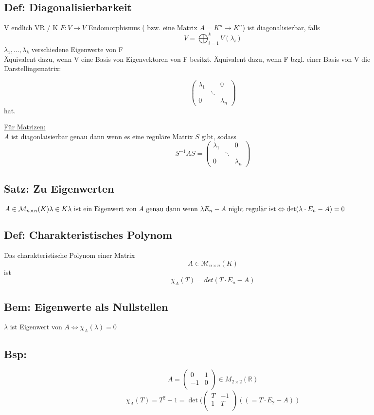 \documentclass[titlepage,12pt,a4paper,ngerman]{report}
\begin{document}
\subsection{Def: Diagonalisierbarkeit} V endlich VR / K
$ F: V \to V$ Endomorphismus ( bzw. eine Matrix $A = K^n \to K^n$) ist diagonalisierbar, falls 
$$V = \bigoplus_{i=1}^{k} V(\lambda_i) $$
$\lambda_1, \dots , \lambda_k $ verschiedene Eigenwerte von F\\
Äquivalent dazu, wenn V eine Basis von Eigenvektoren von F besitzt. Äquivalent dazu, wenn F bzgl. einer Basis von V die  \\
Darstellingsmatrix:

$$\begin{pmatrix}
\lambda_1 & & 0 \\
& \ddots & \\
0 & & \lambda_n
\end{pmatrix}$$
hat.

\underline{Für Matrizen:}\\
$A$ ist diagonlaisierbar genau dann wenn es eine reguläre Matrix $S$ gibt, sodass $$S^{-1}AS=
\begin{pmatrix}
\lambda_1 & & 0 \\
& \ddots & \\
0 & & \lambda_n
\end{pmatrix}$$
\subsection{Satz: Zu Eigenwerten}$ A \in \mathcal{M}_{n \times n}(K)\\
\lambda \in K\\
\lambda \textrm{ ist ein Eigenwert von } A \textrm{ genau dann wenn } \\
\lambda E_n - A \textrm{ night regulär ist} \Leftrightarrow \textrm{det}(\lambda \cdot E_n - A) = 0 $

\subsection{Def: Charakteristisches Polynom} Das charakteristische Polynom einer Matrix
$$ A\in \mathcal{M}_{n\times n}(K)$$ ist 
$$\chi_A (T) = det(T\cdot E_n -A)$$
\subsection{Bem: Eigenwerte als Nullstellen} $\lambda$ ist Eigenwert von $A \Leftrightarrow \chi _A (\lambda) = 0 $
\subsection{Bsp:} 
$$A = \begin{pmatrix}
0 & 1\\
-1 & 0\\
\end{pmatrix} \in M_{2\times 2} (\mathbb{R})$$
$$\chi_A (T) = T^2 + 1 = \det(\begin{pmatrix}
T & -1\\
1 & T\\
\end{pmatrix} ((= T \cdot E_2 - A))$$
\end{document}
